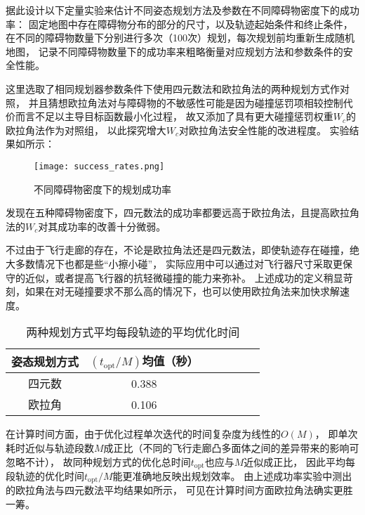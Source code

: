 据此设计以下定量实验来估计不同姿态规划方法及参数在不同障碍物密度下的成功率：
固定地图中存在障碍物分布的部分的尺寸，以及轨迹起始条件和终止条件，
在不同的障碍物数量下分别进行多次（100次）规划，每次规划前均重新生成随机地图，
记录不同障碍物数量下的成功率来粗略衡量对应规划方法和参数条件的安全性能。

这里选取了相同规划器参数条件下使用四元数法和欧拉角法的两种规划方式作对照，
并且猜想欧拉角法对与障碍物的不敏感性可能是因为碰撞惩罚项相较控制代价而言不足以主导目标函数最小化过程，
故又添加了具有更大碰撞惩罚权重$W_c$的欧拉角法作为对照组，
以此探究增大$W_c$对欧拉角法安全性能的改进程度。
实验结果如所示：

\begin{figure}[ht]
    \centering
    \texttt{[image: success\_rates.png]}
    \caption{不同障碍物密度下的规划成功率}
    \label{fig:success_rates}
\end{figure}

发现在五种障碍物密度下，四元数法的成功率都要远高于欧拉角法，且提高欧拉角法的$W_c$对其成功率的改善十分微弱。

不过由于飞行走廊的存在，不论是欧拉角法还是四元数法，即使轨迹存在碰撞，绝大多数情况下也都是些“小擦小碰”，
实际应用中可以通过对飞行器尺寸采取更保守的近似，或者提高飞行器的抗轻微碰撞的能力来弥补。
上述成功的定义稍显苛刻，如果在对无碰撞要求不那么高的情况下，也可以使用欧拉角法来加快求解速度。

\begin{table}[htbp]
    \caption{两种规划方式平均每段轨迹的平均优化时间\label{tab:mean_opt_time_per_segment}}
    \vspace{0.5em}\centering\wuhao
    \begin{tabular}{ccccccc}
    \toprule[1.5pt]
    姿态规划方式 &  $({{t_{\text{opt}}}}/M)$均值（秒）\\
    \midrule[0.2pt]
    四元数 & 0.388 \\
    欧拉角 & 0.106 \\
    \bottomrule[1.5pt]
    \end{tabular}
\end{table}

在计算时间方面，由于优化过程单次迭代的时间复杂度为线性的$O(M)$，
即单次耗时近似与轨迹段数$M$成正比（不同的飞行走廊凸多面体之间的差异带来的影响可忽略不计），
故同种规划方式的优化总时间$t_{\text{opt}}$也应与$M$近似成正比，
因此平均每段轨迹的优化时间$t_{\text{opt}}/M$能更准确地反映出规划效率。
由上述成功率实验中测出的欧拉角法与四元数法平均结果如所示，
可见在计算时间方面欧拉角法确实更胜一筹。

